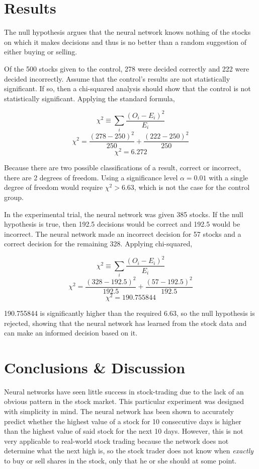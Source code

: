 \documentclass[twocolumn]{article}
\begin{document}
\section{Results}
The null hypothesis argues that the neural network knows nothing of the stocks on which it makes decisions and thus is no better than a random suggestion of either buying or selling.

Of the 500 stocks given to the control, 278 were decided correctly and 222 were decided incorrectly. Assume that the control's results are not statistically significant. If so, then a chi-squared analysis should show that the control is not statistically significant. Applying the standard formula,

$$\chi^2 \equiv \sum_{i} \frac{(O_i - E_i)^2}{E_i}$$
$$\chi^2 = \frac{(278 - 250)^2}{250} + \frac{(222 - 250)^2}{250}$$
$$\chi^2 = 6.272$$

Because there are two possible classifications of a result, correct or incorrect, there are 2 degrees of freedom. Using a significance level $\alpha = 0.01$ with a single degree of freedom would require $\chi^2 > 6.63$, which is not the case for the control group.

In the experimental trial, the neural network was given 385 stocks. If the null hypothesis is true, then 192.5 decisions would be correct and 192.5 would be incorrect. The neural network made an incorrect decision for 57 stocks and a correct decision for the remaining 328. Applying chi-squared,

$$\chi^2 \equiv \sum_{i} \frac{(O_i - E_i)^2}{E_i}$$
$$\chi^2 = \frac{(328 - 192.5)^2}{192.5} + \frac{(57 - 192.5)^2}{192.5}$$
$$\chi^2 = 190.755844$$

190.755844 is significantly higher than the required 6.63, so the null hypothesis is rejected, showing that the neural network has learned from the stock data and can make an informed decision based on it.

\section{Conclusions \& Discussion}
Neural networks have seen little success in stock-trading due to the lack of an obvious pattern in the stock market. This particular experiment was designed with simplicity in mind. The neural network has been shown to accurately predict whether the highest value of a stock for 10 consecutive days is higher than the highest value of said stock for the next 10 days. However, this is not very applicable to real-world stock trading because the network does not determine what the next high is, so the stock trader does not know when \textit{exactly} to buy or sell shares in the stock, only that he or she should at some point.
\end{document}
